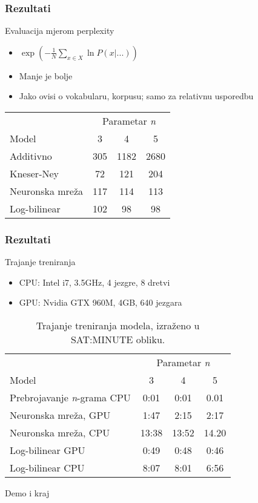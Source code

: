\documentclass[utf8]{beamer}
\begin{document}
\begin{frame}
\frametitle{Rezultati}

	\begin{block}{Evaluacija mjerom perplexity}
	\begin{itemize}[<+->]
		\item{$\exp \left( - \frac{1}{N} \sum_{x \in X} \ln P(x | ...) \right)$}
		\item{Manje je bolje}
		\item{Jako ovisi o vokabularu, korpusu; samo za relativnu usporedbu}
	\end{itemize}
	\end{block}


	\begin{table}[htb]
	\centering
	\begin{tabular}{lccc}
	\toprule
	 & \multicolumn{3}{c}{Parametar \textit{n}} \\
	\cmidrule(r){2-4}
	Model & 3 & 4 & 5 \\
	\midrule
	Additivno &  305 & 1182 & 2680 \\
	Kneser-Ney & 72 & 121 & 204 \\
	Neuronska mreža & 117 & 114 & 113 \\
	Log-bilinear & 102 & 98 & 98 \\
	\bottomrule
	\end{tabular}
	\end{table}

\end{frame}

\begin{frame}
\frametitle{Rezultati}

	\begin{block}{Trajanje treniranja}
	\begin{itemize}[<+->]
		\item{CPU: Intel i7, 3.5GHz, 4 jezgre, 8 dretvi}
		\item{GPU: Nvidia GTX 960M, 4GB, 640 jezgara}
	\end{itemize}
	\end{block}


	\begin{table}[htb]
	\caption{Trajanje treniranja modela, izraženo u SAT:MINUTE obliku.}
	\label{tbl:eval_time}
	\centering
	\begin{tabular}{lccc}
	\toprule
	 & \multicolumn{3}{c}{Parametar \textit{n}} \\
	\cmidrule(r){2-4}
	Model & 3 & 4 & 5 \\
	\midrule
	Prebrojavanje \textit{n}-grama CPU &  0:01 & 0:01 & 0.01 \\
	Neuronska mreža, GPU & 1:47 & 2:15 & 2:17 \\
	Neuronska mreža, CPU & 13:38 & 13:52 & 14.20 \\
	Log-bilinear GPU & 0:49 & 0:48 & 0:46 \\
	Log-bilinear CPU & 8:07 & 8:01 & 6:56 \\
	\bottomrule
	\end{tabular}
	\end{table}

\end{frame}

\begin{frame}

	Demo i kraj
	
\end{frame}

\end{document}
